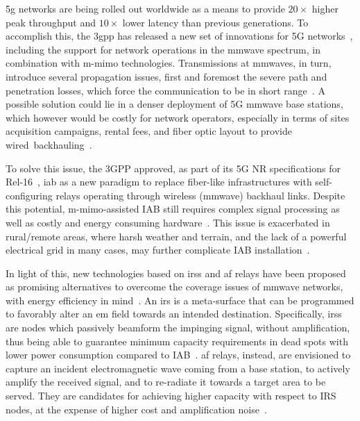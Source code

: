 
\Gls{5g} networks are being rolled out worldwide 
as a means to provide $20\times$ higher peak throughput and $10\times$ lower latency than previous generations.
To accomplish this, the \gls{3gpp} has released a new set of innovations for 5G networks~\cite{38300}, including the support for network operations in the \gls{mmwave} spectrum, in combination with \gls{m-mimo} technologies.
Transmissions at \glspl{mmwave}, in turn, introduce several propagation issues, first and foremost the severe path and penetration losses, which force the communication to be in short range~\cite{rangan2017potentials}.
A possible solution could lie in a denser deployment of 5G \gls{mmwave} base stations, which however would be costly for network operators, especially in terms of sites acquisition campaigns, rental fees, and fiber optic layout to provide wired~backhauling~\cite{lopez2015towards}. 


To solve this issue, the 3GPP approved, as part of its 5G NR specifications for Rel-16~\cite{38874}, \gls{iab} as a new paradigm to replace fiber-like infrastructures with self-configuring relays operating through wireless (\gls{mmwave}) backhaul links.
Despite this potential, \mbox{\gls{m-mimo}-assisted} IAB still requires complex signal processing as well as costly and energy consuming hardware~\cite{polese2020integrated}.
This issue is exacerbated in rural/remote areas, where harsh weather and terrain, and the lack of a powerful electrical grid in many cases, may further complicate IAB installation~\cite{chaoub20216g}.

In light of this, new technologies based on \glspl{irs} and \gls{af} relays have been proposed as promising alternatives to overcome the coverage issues of \gls{mmwave} networks, with energy efficiency in mind~\cite{flamini2022towards}. 
An \gls{irs} is a meta-surface that can be programmed to favorably alter an \gls{em} field towards an intended destination. 
Specifically, \glspl{irs} are nodes which passively beamform the impinging signal, without amplification, thus being able to guarantee minimum capacity requirements in dead spots with lower power consumption compared to IAB~\cite{bjornson2019intelligent}. 
\Gls{af} relays, instead, are envisioned to capture an incident electromagnetic wave %
coming from a base station, to actively amplify the received signal, and to re-radiate it %
towards a target area to be served. They are candidates for achieving higher capacity with respect to IRS nodes, at the expense of higher cost and amplification noise~\cite{huang2019reconfigurable}.

